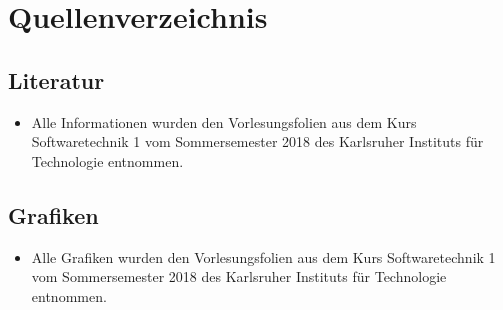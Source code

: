 \section{Quellenverzeichnis}
	
\subsection{Literatur}
	
\begin{itemize}
\item Alle Informationen wurden den Vorlesungsfolien aus dem Kurs Softwaretechnik 1 vom Sommersemester 2018 des Karlsruher Instituts für Technologie entnommen.
\end{itemize}
	
\subsection{Grafiken}
		
\begin{itemize}
\item Alle Grafiken wurden den Vorlesungsfolien aus dem Kurs Softwaretechnik 1 vom Sommersemester 2018 des Karlsruher Instituts für Technologie entnommen.
\end{itemize}
